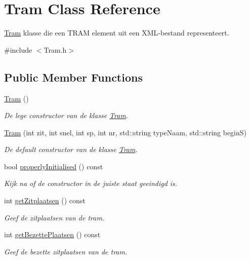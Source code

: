 \hypertarget{class_tram}{}\section{Tram Class Reference}
\label{class_tram}


\hyperlink{class_tram}{Tram} klasse die een T\+R\+AM element uit een X\+M\+L-\/bestand representeert.  




{\ttfamily \#include $<$Tram.\+h$>$}

\subsection*{Public Member Functions}
\begin{DoxyCompactItemize}
\item 
\hyperlink{class_tram_aad83b2e7e79d57528691bf317ab0e1ef}{Tram} ()
\begin{DoxyCompactList}\small\item\em De lege constructor van de klasse \hyperlink{class_tram}{Tram}. \end{DoxyCompactList}\item 
\hyperlink{class_tram_ab7693318707ed2e2f0a0c166f6071db9}{Tram} (int zit, int snel, int sp, int nr, std\+::string type\+Naam, std\+::string beginS)
\begin{DoxyCompactList}\small\item\em De default constructor van de klasse \hyperlink{class_tram}{Tram}. \end{DoxyCompactList}\item 
bool \hyperlink{class_tram_a98992eff0453f54fbe64e1f1064169c7}{properly\+Initialised} () const 
\begin{DoxyCompactList}\small\item\em Kijk na of de constructor in de juiste staat geeindigd is. \end{DoxyCompactList}\item 
int \hyperlink{class_tram_aa366e37291186d6cfd402aa7b6cfec2d}{get\+Zitplaatsen} () const 
\begin{DoxyCompactList}\small\item\em Geef de zitplaatsen van de tram. \end{DoxyCompactList}\item 
int \hyperlink{class_tram_a4ca765b8e0d031acad9c70f1643b5e41}{get\+Bezette\+Plaatsen} () const 
\begin{DoxyCompactList}\small\item\em Geef de bezette zitplaatsen van de tram. \end{DoxyCompactList}\item 

\end{DoxyCompactItemize}
